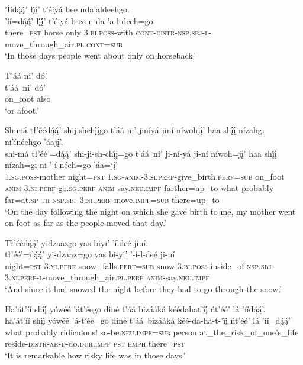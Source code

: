 \ea\label{ex:text1-3-3}
’Íídą́ą́’ łį́į́’ t’éiyá bee nda’aldeehgo.\\
\gll ’íí=dą́ą́’	łį́į́’	t’éiyá	b-ee	n-da-’a-l-deeh=go\\
     there=\textsc{pst}	horse	only	3.\textsc{bi}.\textsc{poss}-with	\textsc{cont}-\textsc{distr}-\textsc{nsp}.\textsc{sbj}-\textsc{l}-move\_through\_air.\textsc{pl}.\textsc{cont}=\textsc{sub}\\
\glt `In those days people went about only on horseback'
\z

\ea\label{ex:text1-3-4}
T’áá ni’ dó’.\\
\gll t’áá~{ni’}	dó’\\
     on\_foot	also\\
\glt `or afoot.'
\z


\ea\label{ex:text1-4-1}
Shimá tł’éédą́ą́’ shijishchį́įgo t’áá ni’ jiníyá jiní níwohjį’ haa shį́į́ nízahgi ni’ínéehgo ’áajį’.\\
\gll shi-má	tł’éé’=dą́ą́’	shi-ji-sh-chį́į=go	t’áá~{ni’}	ji-ní-yá	ji-ní	níwoh=jį’	haa	shį́į́	nízah=gi	ni-’-í-néeh=go	’áa=jį’\\
     1.\textsc{sg}.\textsc{poss}-mother	night=\textsc{pst}	1.\textsc{sg}-\textsc{anim}-3.\textsc{si}.\textsc{perf}-give\_birth.\textsc{perf}=\textsc{sub}	on\_foot	\textsc{anim}-3.\textsc{ni}.\textsc{perf}-go.\textsc{sg}.\textsc{perf}	\textsc{anim}-say.\textsc{neu}.\textsc{impf}	farther=up\_to	what	probably	far=at.\textsc{sp}	\textsc{th}-\textsc{nsp}.\textsc{sbj}-3.\textsc{ni}.\textsc{perf}-move.\textsc{impf}=\textsc{sub}	there=up\_to\\
\glt `On the day following the night on which she gave birth to me, my mother went on foot as far as the people moved that day.'
\z

\ea\label{ex:text1-4-2}
Tł’éédą́ą́’ yidzaazgo yas biyi’ ’íldeé jiní.\\
\gll tł’éé’=dą́ą́’	yi-dzaaz=go	yas	bi-yi’	’-í-l-deé	ji-ní\\
     night=\textsc{pst}	3.\textsc{yi}.\textsc{perf}-snow\_falls.\textsc{perf}=\textsc{sub}	snow	3.\textsc{bi}.\textsc{poss}-inside\_of	\textsc{nsp}.\textsc{sbj}-3.\textsc{ni}.\textsc{perf}-\textsc{l}-move\_through\_air.\textsc{pl}.\textsc{perf}	\textsc{anim}-say.\textsc{neu}.\textsc{impf}\\
\glt `And since it had snowed the night before they had to go through the snow.'
\z

\ea\label{ex:text1-4-3}
Ha’át’íí shį́į́ yówéé ’át’éego diné t’áá bizááká kéédahat’į́į́ ńt’éé’ lá ’íídą́ą́’.\\
\gll ha’át’íí	shį́į́	yówéé	’á-t’ée=go	diné	t’áá~{bizááká}	kéé-da-ha-t-’į́į́ ńt’éé’	lá	’íí=dą́ą́’\\
     what	probably	ridiculous!	so-be.\textsc{neu}.\textsc{impf}=\textsc{sub}	person	at\_the\_risk\_of\_one’s\_life	reside-\textsc{distr}-\textsc{ar}-\textsc{d}-do.\textsc{dur}.\textsc{impf} \textsc{pst}	\textsc{emph}	there=\textsc{pst}\\
\glt `It is remarkable how risky life was in those days.'
\z

